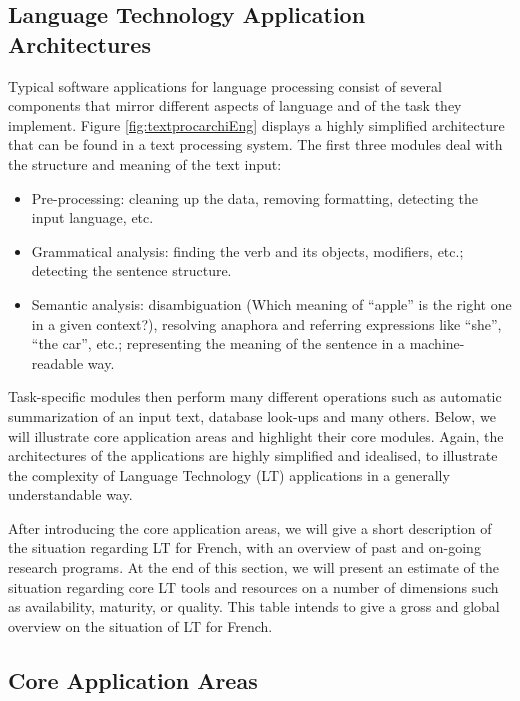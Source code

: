\begin{multicols}{2}
\subsection{Language Technology Application Architectures}

Typical software applications for language processing consist of
several components that mirror different aspects of language and of
the task they implement. Figure \ref{fig:textprocarchiEng} displays a highly
simplified architecture that can be found in a text processing
system. The first three modules deal with the structure and meaning of
the text input:
\begin{itemize}
\item Pre-processing: cleaning up the data, removing formatting,
  detecting the input language, etc.
\item Grammatical analysis: finding the verb and its objects,
  modifiers, etc.; detecting the sentence structure.
\item Semantic analysis: disambiguation (Which meaning of ``apple'' is the
  right one in a given context?), resolving anaphora and referring
  expressions like ``she'', ``the car'', etc.; representing the meaning of the
  sentence in a machine-readable way.
\end{itemize}

Task-specific modules then perform many different operations such as
automatic summarization of an input text, database look-ups and many
others. Below, we will illustrate core application areas and highlight
their core modules. Again, the architectures of the applications are
highly simplified and idealised, to illustrate the complexity of
Language Technology (LT) applications in a generally understandable
way.



After introducing the core application areas, we will give a short
description of the situation regarding LT for French, with an overview
of past and on-going research programs. At the end of this section, we
will present an estimate of the situation regarding core LT tools and
resources on a number of dimensions such as availability, maturity, or
quality. This table intends to give a gross and global overview on the
situation of LT for French.

\subsection{Core Application Areas}


\end{multicols}
